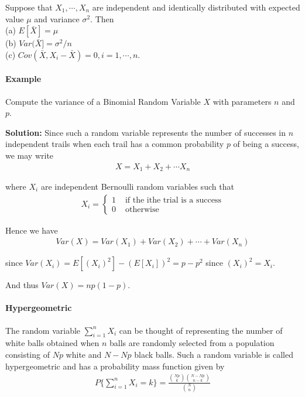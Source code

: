 \documentclass[10 pt,final]{article}
\newcommand{\impo}[1]{{\color{magenta} #1}}
\begin{document}
\begin{proposition}
Suppose that $X_1, \cdots, X_n$ are independent and identically distributed with expected value $\mu$ and variance $\sigma^2$. Then\\
(a) $E[\bar{X}] = \mu$ \\
(b) $Var(\bar{X}] = \sigma^2/n$ \\ 
(c) $Cov(\bar{X}, X_i - \bar{X}) = 0, i=1,\cdots, n.$
\end{proposition}

\paragraph{Example} Compute the variance of a \impo{Binomial Random Variable} $X$ with parameters $n$ and $p$.

\textbf{Solution:} Since such a random variable represents the number of successes in $n$ independent trails when each trail has a common probability $p$ of being a success, we may write
\begin{align*}
X = X_1 + X_2 + \cdots X_n
\end{align*}

where $X_i$ are independent \impo{Bernoulli random variables} such that 
\begin{align*}
X_i = 
\begin{cases}
1 & \mbox{ if the ithe trial is a success} \\
0 & \mbox{ otherwise}
\end{cases}
\end{align*}

Hence we have
\begin{align*}
Var(X) = Var(X_1) + Var(X_2) + \cdots + Var(X_n)
\end{align*}

since $Var(X_i) = E[(X_i)^2] - (E[X_i])^2 = p - p^2$ since $(X_i)^2 = X_i$.

And thus $Var(X) = np(1-p)$.



\paragraph{\impo{Hypergeometric}} The random variable $\sum^n_{i=1} X_i$ can be thought of representing the number of white balls obtained when $n$ balls are randomly selected from a population consisting of $Np$ white and $N-Np$ black balls. Such a random variable is called \impo{hypergeometric} and has a probability mass function given by 
\begin{align*}
P\{\sum^n_{i=1} X_i = k\} = \frac{\binom{Np}{k} \binom{N-Np}{n-k}}{\binom{N}{n}}
\end{align*}
\end{document}
